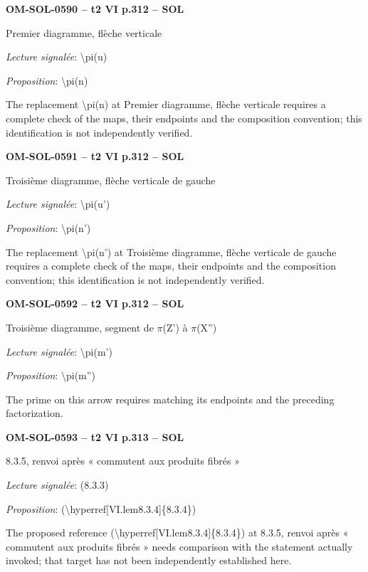 \par\noindent\textbf{OM-SOL-0590 -- t2 VI p.312 -- SOL}\par
Premier diagramme, flèche verticale\par
\emph{Lecture signalée}: \textbackslash{}pi(u)\par
\emph{Proposition}: \textbackslash{}pi(n)\par
The replacement \textbackslash{}pi(n) at Premier diagramme, flèche verticale requires a complete check of the maps, their endpoints and the composition convention; this identification is not independently verified.\par
\par\noindent\textbf{OM-SOL-0591 -- t2 VI p.312 -- SOL}\par
Troisième diagramme, flèche verticale de gauche\par
\emph{Lecture signalée}: \textbackslash{}pi(u')\par
\emph{Proposition}: \textbackslash{}pi(n')\par
The replacement \textbackslash{}pi(n') at Troisième diagramme, flèche verticale de gauche requires a complete check of the maps, their endpoints and the composition convention; this identification is not independently verified.\par
\par\noindent\textbf{OM-SOL-0592 -- t2 VI p.312 -- SOL}\par
Troisième diagramme, segment de \ensuremath{\pi}(Z') à \ensuremath{\pi}(X'')\par
\emph{Lecture signalée}: \textbackslash{}pi(m')\par
\emph{Proposition}: \textbackslash{}pi(m'')\par
The prime on this arrow requires matching its endpoints and the preceding factorization.\par
\par\noindent\textbf{OM-SOL-0593 -- t2 VI p.313 -- SOL}\par
8.3.5, renvoi après « commutent aux produits fibrés »\par
\emph{Lecture signalée}: (8.3.3)\par
\emph{Proposition}: (\textbackslash{}hyperref[VI.lem8.3.4]\{8.3.4\})\par
The proposed reference (\textbackslash{}hyperref[VI.lem8.3.4]\{8.3.4\}) at 8.3.5, renvoi après « commutent aux produits fibrés » needs comparison with the statement actually invoked; that target has not been independently established here.\par
